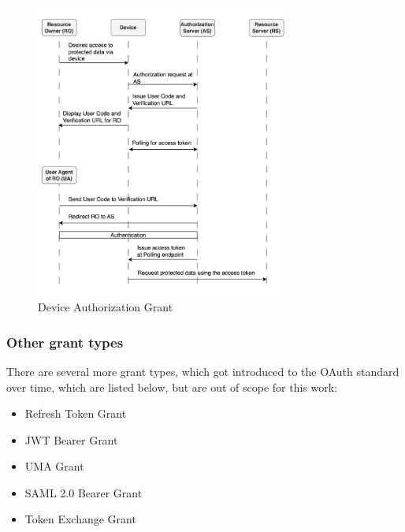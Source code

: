 \documentclass[
    fontsize=12pt,
    headings=small,
    parskip=half,           %
    bibliography=totoc,
    numbers=noenddot,       %
    open=any,               %
    ]{scrreprt}
\begin{document}
\begin{figure}[ht]
	\sffamily\footnotesize
	\includegraphics[width=0.75\textwidth]{pic/device_authorization_grant.png}
	\unitlength=0.75mm
	\linethickness{0.4pt}
	\caption{Device Authorization Grant}
	\label{fig:device_authorization_grant}
\end{figure}

\subsubsection{Other grant types}
There are several more grant types, which got introduced to the OAuth standard
over time, which are listed below, but are out of scope for this work: 

\begin{itemize}
	\item Refresh Token Grant
	\item JWT Bearer Grant
	\item UMA Grant
	\item SAML 2.0 Bearer Grant
	\item Token Exchange Grant
\end{itemize}
\end{document}
